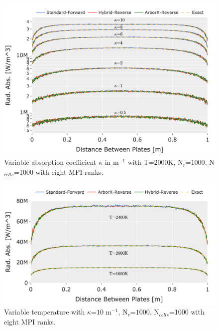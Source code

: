 \begin{figure}[!ht]
\centering
\includegraphics[width=0.95\linewidth]{figures/ch4/PPcomparison1_multinode.png}
\caption{Variable absorption coefficient $\kappa{}$ in m$^{-1}$ with T=$2000$K, N$_r$=$1000$, N$_{cells}$=1000 with eight MPI ranks.}
\label{fig:PPcomp_kappa_mpi}
\end{figure}
\begin{figure}[!ht]
\centering
\includegraphics[width=0.95\linewidth]{figures/ch4/PPcomparison2_multinode.png}
\caption{Variable temperature with $\kappa{}$=$10$ m$^{-1}$, N$_r$=$1000$, N$_{cells}$=1000 with eight MPI ranks.}
\label{fig:PPcomp_temp_mpi}
\end{figure}
